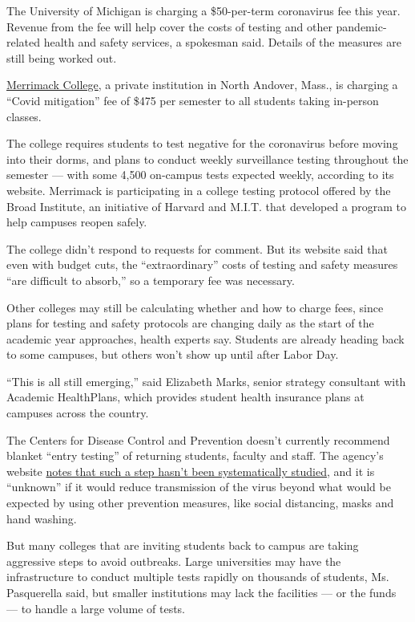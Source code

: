The University of Michigan is charging a \$50-per-term coronavirus fee
this year. Revenue from the fee will help cover the costs of testing and
other pandemic-related health and safety services, a spokesman said.
Details of the measures are still being worked out.

\href{https://www.merrimack.edu/covid-19/tuition-and-financial-aid/}{Merrimack
College}, a private institution in North Andover, Mass., is charging a
``Covid mitigation'' fee of \$475 per semester to all students taking
in-person classes.

The college requires students to test negative for the coronavirus
before moving into their dorms, and plans to conduct weekly surveillance
testing throughout the semester --- with some 4,500 on-campus tests
expected weekly, according to its website. Merrimack is participating in
a college testing protocol offered by the Broad Institute, an initiative
of Harvard and M.I.T. that developed a program to help campuses reopen
safely.

The college didn't respond to requests for comment. But its website said
that even with budget cuts, the ``extraordinary'' costs of testing and
safety measures ``are difficult to absorb,'' so a temporary fee was
necessary.

Other colleges may still be calculating whether and how to charge fees,
since plans for testing and safety protocols are changing daily as the
start of the academic year approaches, health experts say. Students are
already heading back to some campuses, but others won't show up until
after Labor Day.

``This is all still emerging,'' said Elizabeth Marks, senior strategy
consultant with Academic HealthPlans, which provides student health
insurance plans at campuses across the country.

The Centers for Disease Control and Prevention doesn't currently
recommend blanket ``entry testing'' of returning students, faculty and
staff. The agency's website
\href{https://www.cdc.gov/coronavirus/2019-ncov/community/colleges-universities/ihe-testing.html}{notes
that such a step hasn't been systematically studied}, and it is
``unknown'' if it would reduce transmission of the virus beyond what
would be expected by using other prevention measures, like social
distancing, masks and hand washing.

But many colleges that are inviting students back to campus are taking
aggressive steps to avoid outbreaks. Large universities may have the
infrastructure to conduct multiple tests rapidly on thousands of
students, Ms. Pasquerella said, but smaller institutions may lack the
facilities --- or the funds --- to handle a large volume of tests.

